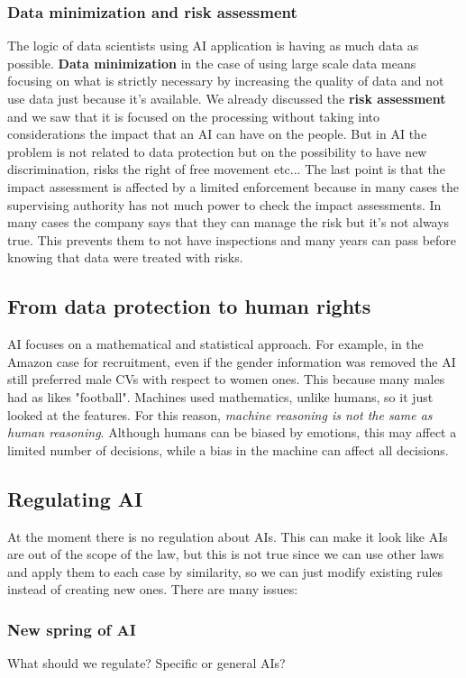 \subsubsection{Data minimization and risk assessment}
The logic of data scientists using AI application is having as much data as possible. \textbf{Data minimization} in the case of using large scale data means focusing on what is strictly necessary by increasing the quality of data and not use data just because it's available.
We already discussed the \textbf{risk assessment} and we saw that it is focused on the processing without taking into considerations the impact that an AI can have on the people. But in AI the problem is not related to data protection but on the possibility to have new discrimination, risks the right of free movement etc...
The last point is that the impact assessment is affected by a limited enforcement because in many cases the supervising authority has not much power to check the impact assessments.
In many cases the company says that they can manage the risk but it's not always true. This prevents them to not have inspections and many years can pass before knowing that data were treated with risks.

\subsection{From data protection to human rights}
AI focuses on a mathematical and statistical approach. For example, in the Amazon case for recruitment, even if the gender information was removed the AI still preferred male CVs with respect to women ones. This because many males had as likes "football". Machines used mathematics, unlike humans, so it just looked at the features. For this reason, \textit{machine reasoning is not the same as human reasoning}. Although humans can be biased by emotions, this may affect a limited number of decisions, while a bias in the machine can affect all decisions.

\subsection{Regulating AI}
At the moment there is no regulation about AIs. This can make it look like AIs are out of the scope of the law, but this is not true since we can use other laws and apply them to each case by similarity, so we can just modify existing rules instead of creating new ones. There are many issues:
\subsubsection{New spring of AI}
What should we regulate? Specific or general AIs?

